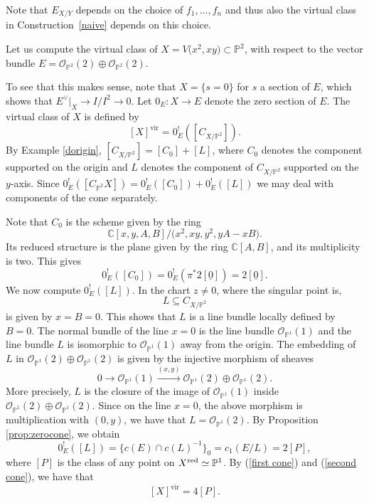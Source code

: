 \documentclass[pdftex]{sigma}
\numberwithin{equation}{section}
\newcommand{\vv}{\mathrm{vir}}
\newcommand{\PP}{\mathbb P}
\theoremstyle{plain}
\theoremstyle{definition}
\theoremstyle{remark}
\begin{document}
Note that $E_{X/Y}$ depends on the choice of $f_1,\ldots, f_n$ and thus also the virtual class in Construction~\ref{naive} depends on this choice.
\begin{Example}\label{doublepoint}
Let us compute the virtual class of $X=V\big(x^2,xy\big)\subset\mathbb{P}^2$, with respect to the vector bundle $E=\mathcal{O}_{\mathbb{P}^2}(2)\oplus \mathcal{O}_{\mathbb{P}^2}(2)$.

To see that this makes sense, note that $X=\{s=0\}$ for $s$ a section of $E$, which shows that $E^\vee\rvert_X\to I/I^2\to 0$. Let $0_E\colon X\to E$ denote the zero section of $E$. The virtual class of $X$ is defined by
\[[X]^{\vv}=0_E^!([C_{X/\mathbb{P}^2}]).
\]
By Example \ref{dorigin}, $[C_{X/\mathbb{P}^2}]=[C_0]+[L]$, where $C_0$ denotes the component supported on the origin and $L$ denotes the component of $C_{X/\mathbb{P}^2}$ supported on the $y$-axis. Since $0_E^!([C_{\mathbb{P}^2} X])=0_E^!([C_0])+0_E^!([L])$ we may deal with components of the cone separately.

Note that $C_0$ is the scheme given by the ring
\[
\mathbb C[x,y,A,B]/ \big(x^2,xy,y^2, yA-xB\big).
\]
Its reduced structure is the plane given by the ring $\mathbb C[A,B]$, and its multiplicity is two. This gives
\begin{equation}\label{first cone}
0_E^!([C_0])=0_E^!(\pi^*2[\underline 0])=2[\underline 0].
\end{equation}
We now compute $0_E^!([L])$. In the chart $z\neq 0$, where the singular point is,
\[L\subseteq C_{X/\mathbb{P}^2} \]
is given by $x=B=0$. This shows that $L$ is a line bundle locally defined by $B=0$. The normal bundle of the line $x=0$ is the line bundle $\mathcal{O}_{\PP^1}(1)$ and the line bundle $L$ is isomorphic to $\mathcal{O}_{\PP^1}(1)$ away from the origin. The embedding of $L$ in $\mathcal{O}_{\PP^1}(2)\oplus \mathcal{O}_{\PP^1}(2)$ is given by the injective morphism of sheaves
\[
0\to \mathcal{O}_{\PP^1}(1)\stackrel{(x,y)}{\longrightarrow} \mathcal{O}_{\PP^1}(2)\oplus \mathcal{O}_{\PP^1}(2).
\]
More precisely, $L$ is the closure of the image of $\mathcal{O}_{\PP^1}(1)$ inside $\mathcal{O}_{\PP^1}(2)\oplus \mathcal{O}_{\PP^1}(2)$.
Since on the line $x=0$, the above morphism is multiplication with $(0, y)$, we have that $L=\mathcal O_{\mathbb{P}^1}(2)$.
By Proposition \ref{prop:zerocone}, we obtain
\begin{equation}\label{second cone}
0_E^!([L])=\big\{c(E)\cap c(L)^{-1}\big\}_{0}=c_1(E/L)=2[P],
\end{equation}
where $[P]$ is the class of any point on $X^{\rm red}\simeq\mathbb{P}^1$. By (\ref{first cone}) and (\ref{second cone}), we have that
\[[X]^{\vv}=4[P].
\]
\end{Example}
\end{document}
